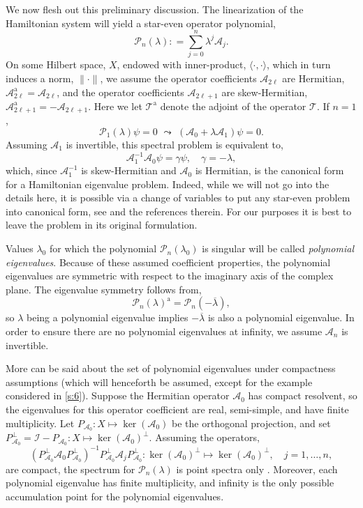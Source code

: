 \documentclass[review,onefignum,onetabnum]{siamart171218}
\def\ker{\mathop\mathrm{ker}\nolimits}
\def\coloneqq{\mathrel{\mathop:}=}
\newcommand{\rma}{\mathrm{a}}
\newcommand{\calA}{\mathcal{A}}
\newcommand{\calI}{\mathcal{I}}
\newcommand{\calP}{\mathcal{P}}
\newcommand{\calT}{\mathcal{T}}
\begin{document}
We now flesh out this preliminary discussion. The linearization of the Hamiltonian system will yield a star-even operator polynomial,
\[
\calP_n(\lambda)\coloneqq\sum_{j=0}^n\lambda^j\calA_j.
\]
On some Hilbert space, $X$, endowed with inner-product,
$\langle\cdot,\cdot\rangle$, which in turn induces a norm, $\|\cdot\|$,
we assume the operator coefficients $\calA_{2\ell}$ are
Hermitian, $\calA_{2\ell}^\rma=\calA_{2\ell}$, and the operator coefficients
$\calA_{2\ell+1}$ are skew-Hermitian,
$\calA_{2\ell+1}^\rma=-\calA_{2\ell+1}$. Here we let $\calT^\rma$ denote the adjoint of the operator $\calT$. If $n=1$,
\[
\calP_1(\lambda)\psi=0\,\,\leadsto\,\,
\left(\calA_0+\lambda\calA_1\right)\psi=0.
\]
Assuming $\calA_1$ is invertible, this spectral problem is equivalent to,
\[
\calA_1^{-1}\calA_0\psi=\gamma\psi,\quad\gamma=-\lambda,
\]
which, since $\calA_1^{-1}$ is skew-Hermitian and $\calA_0$ is Hermitian, is the canonical form for a Hamiltonian eigenvalue problem. Indeed, while we will not go into the details here, it is possible via a change of variables to put any star-even problem into canonical form, see \cite[Section~3]{kapitula:iif13} and the references therein. For our purposes it is best to leave the problem in its original formulation.

Values $\lambda_0$ for which the polynomial
$\calP_n(\lambda_0)$ is singular will be called \textit{polynomial
eigenvalues}. Because of these assumed coefficient properties, the polynomial
eigenvalues are symmetric with respect to the imaginary axis of the complex
plane. The eigenvalue symmetry follows from,
\[
\calP_n(\lambda)^\rma=\calP_n(-\overline{\lambda}),
\]
so $\lambda$ being a polynomial eigenvalue implies $-\overline{\lambda}$ is also a polynomial eigenvalue.
In order to ensure there are no polynomial eigenvalues at infinity, we assume
$\calA_n$ is invertible.

More can be said about the set of polynomial eigenvalues under compactness
assumptions (which will henceforth be assumed, except for the example considered in \cref{s:6}). Suppose the Hermitian
operator $\calA_0$ has compact resolvent, so the eigenvalues for this
operator coefficient are real, semi-simple, and have finite multiplicity. Let
$P_{\calA_0}:X\mapsto\ker(\calA_0)$ be the orthogonal projection, and set
$P_{\calA_0}^\perp=\calI-P_{\calA_0}:X\mapsto\ker(\calA_0)^\perp$. Assuming
the operators,
\[
\left(P_{\calA_0}^\perp\calA_0P_{\calA_0}^\perp\right)^{-1}
P_{\calA_0}^\perp\calA_jP_{\calA_0}^\perp:\ker(\calA_0)^\perp\mapsto\ker(\calA_0)^\perp,\quad
j=1,\dots,n,
\]
are compact, the spectrum for $\calP_n(\lambda)$ is point spectra only
\cite[Remark~2.2]{bronski:aii14}. Moreover, each polynomial eigenvalue has
finite multiplicity, and infinity is the only possible accumulation point for
the polynomial eigenvalues.
\end{document}
